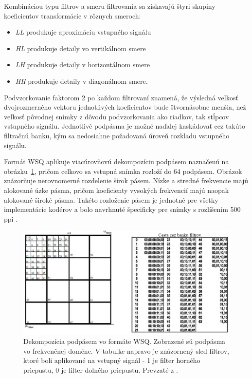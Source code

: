   Kombináciou typu filtrov a smeru filtrovania sa získavajú štyri skupiny koeficientov transformácie v rôznych smeroch: 
  \begin{itemize}
    \item \emph{LL} produkuje aproximáciu vstupného signálu
    \item \emph{HL} produkuje detaily vo vertikálnom smere
    \item \emph{LH} produkuje detaily v horizontálnom smere
    \item \emph{HH} produkuje detaily v diagonálnom smere.
  \end{itemize}
  Podvzorkovanie faktorom 2 po každom filtrovaní znamená, že výsledná veľkosť dvojrozmerného vektoru jednotlivých koeficientov bude štvornásobne
  menšia, než veľkosť pôvodnej snímky z dôvodu podvzorkovania ako riadkov, tak stĺpcov vstupného signálu.
  Jednotlivé podpásma je možné naďalej kaskádovať cez takúto filtračnú banku, kým sa nedosiahne požadovaná úroveň rozkladu vstupného signálu.

  Formát WSQ aplikuje viacúrovňovú dekompozíciu podpásem naznačenú na obrázku~{\ref{obr:WSQ_DWT_dekompozicia}}, pričom celkovo sa vstupná snímka rozloží
  do 64 podpásem. Obrázok znázorňuje nerovnomerné rozdelenie šírok pásem. Nízke a stredné frekvencie majú alokované úzke pásma, pričom koeficienty vysokých
  frekvencií majú naopak alokované široké pásma. Takéto rozloženie pásem je jednotné pre všetky implementácie kodérov a bolo navrhnuté špecificky pre snímky
  s rozlíšením 500 ppi \cite{brislawn1996compression}.

  \begin{figure}[h]
    \centering
    \includegraphics[width=\linewidth]{obrazky-figures/WSQ_DWT_subband_decomposition.png}
    \caption{Dekompozícia podpásem vo formáte WSQ. Zobrazené sú podpásma vo frekvenčnej doméne. V tabuľke napravo je znázornený sled filtrov, ktoré boli
    aplikované na vstupný signál - 1 je filter horného priepustu, 0 je filter dolného priepustu. Prevzaté z \cite{WSQSpecification}.}
    \label{obr:WSQ_DWT_dekompozicia}
  \end{figure}


